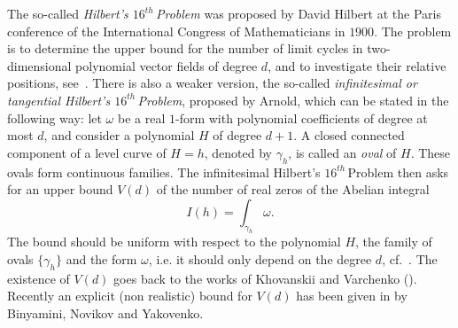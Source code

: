 \documentclass[12pt,psamsfonts]{amsart}
\begin{document}
The so-called \emph{Hilbert's $16^{th}\,$Problem} was proposed by David Hilbert at the Paris
conference of the International Congress of Mathematicians in $1900$. The problem is to  determine
the upper bound for the number of limit cycles in two-dimensional polynomial vector fields of
degree $d$, and to investigate their relative positions, see~\cite{Ilia,Li}. There is also a
weaker version, the so-called \emph{infinitesimal or tangential Hilbert's $16^{th}\,$Problem},
proposed by Arnold, which can be stated in the following way: let ${\omega}$ be a real $1$-form with
polynomial coefficients of degree at most $d$, and consider a polynomial $H$ of degree $d+1$. A
closed connected component of a level curve of $H=h$, denoted by ${\gamma}_h$, is called an \emph{oval}
of $H$. These ovals form continuous families. The infinitesimal Hilbert's $16^{th}\,$Problem then
asks for an upper bound $V(d)$ of the number of real zeros of the Abelian integral
\begin{equation*}
    I(h) = \int_{{\gamma}_h} {\omega}.
\end{equation*}
The bound should be uniform with respect to the polynomial $H$, the
family of ovals $\{{\gamma}_h\}$ and the form ${\omega}$, i.e. it should only
depend on the degree $d$, cf.~\cite{Ilia, Iliev1999}. The existence
of $V(d)$ goes back to the works of Khovanskii and Varchenko
(\cite{Kh,Var}). Recently an explicit (non realistic) bound  for
$V(d)$ has been given in \cite{Bin} by Binyamini, Novikov and
Yakovenko.
\end{document}
